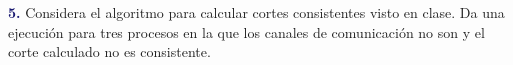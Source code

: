\newpage
\textbf{\textcolor{MidnightBlue}{5.}}
Considera el algoritmo para calcular cortes consistentes visto en clase. Da una ejecución
para tres procesos en la que los canales de comunicación no son  y el corte
calculado no es consistente.
